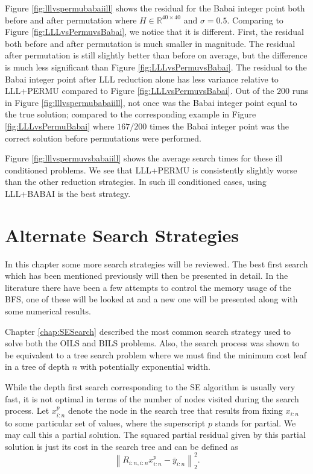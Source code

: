 \documentclass[12pt,Bold,letterpaper]{mcgilletdclass}
\begin{document}
Figure \ref{fig:lllvspermubabaiill} shows the residual for the Babai integer point both before and after permutation where $H \in \mathbb{R}^{40 \times 40}$ and $\sigma = 0.5$. Comparing to Figure \ref{fig:LLLvsPermuvsBabai}, we notice that it is different. First, the residual both before and after permutation is much smaller in magnitude. The residual after permutation is still slightly better than before on average, but the difference is much less significant than Figure \ref{fig:LLLvsPermuvsBabai}. The residual to the Babai integer point after LLL reduction alone has less variance relative to LLL+PERMU compared to Figure \ref{fig:LLLvsPermuvsBabai}. Out of the $200$ runs in Figure \ref{fig:lllvspermubabaiill}, not once was the Babai integer point equal to the true solution; compared to the corresponding example in Figure \ref{fig:LLLvsPermuBabai} where $167/200$ times the Babai integer point was the correct solution before permutations were performed. 

Figure \ref{fig:lllvspermuvsbabaiill} shows the average search times for these ill conditioned problems. We see that LLL+PERMU is consistently slightly worse than the other reduction strategies. In such ill conditioned cases, using LLL+BABAI is the best strategy.

\chapter{Alternate Search Strategies} \label{chap:Searches}

In this chapter some more search strategies will be reviewed. The best first search which has been mentioned previously will then be presented in detail. In the literature there have been a few attempts to control the memory usage of the BFS, one of these will be looked at and a new one will be presented along with some numerical results.

Chapter \ref{chap:SESearch} described the most common search strategy used to solve both the OILS and BILS problems. Also, the search process was shown to be equivalent to a tree search problem where we must find the minimum cost leaf in a tree of depth $n$ with potentially exponential width.

While the depth first search corresponding to the SE algorithm is usually very fast, it is not optimal in terms of the number of nodes visited during the search process. Let $x_{i:n}^p$ denote the node in the search tree that results from fixing $x_{i:n}$ to some particular set of values, where the superscript $p$ stands for partial. We may call this a partial solution. The squared partial residual given by this partial solution is just its cost in the search tree and can be defined as $$\left \| R_{i:n,i:n}x_{i:n}^p - \bar{y}_{i:n}\right \|_2^2.$$ 
\end{document}
